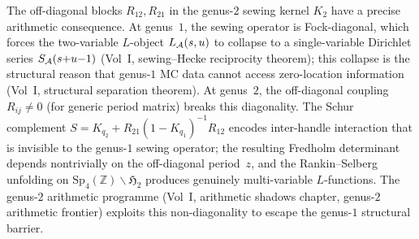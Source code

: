 \begin{remark}%
\label{rem:genus2-arithmetic-significance}%
%
The off-diagonal blocks $R_{12}, R_{21}$ in the genus-$2$
sewing kernel $K_2$ have a precise arithmetic consequence.
At genus~$1$, the sewing operator is Fock-diagonal, which
forces the two-variable $L$-object $L_{\mathcal{A}}(s,u)$ to collapse
to a single-variable Dirichlet series $S_{\mathcal{A}}(s{+}u{-}1)$
(Vol~I, sewing--Hecke reciprocity theorem);
this collapse is the structural reason that genus-$1$ MC
data cannot access zero-location information
(Vol~I, structural separation theorem).
At genus~$2$, the off-diagonal coupling $R_{ij} \neq 0$
(for generic period matrix) breaks this diagonality.
The Schur complement
$S = K_{q_2} + R_{21}(1{-}K_{q_1})^{-1}R_{12}$
encodes inter-handle interaction that is invisible to the
genus-$1$ sewing operator; the resulting Fredholm
determinant depends nontrivially on the off-diagonal
period~$z$, and the Rankin--Selberg unfolding on
$\mathrm{Sp}_4(\mathbb{Z}) \backslash \mathfrak{H}_2$
produces genuinely multi-variable $L$-functions.
The genus-$2$ arithmetic programme
(Vol~I, arithmetic shadows chapter,
genus-$2$ arithmetic frontier)
exploits this non-diagonality to escape the genus-$1$
structural barrier.
\end{remark}

